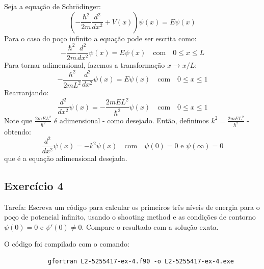 \documentclass[12pt, a4paper]{article} %
\begin{document}
        Seja a equação de Schr\"odinger:
        \begin{equation}
                \left(-\frac{\hbar^2}{2m}\frac{d^2}{dx^2} + V(x)\right)\psi(x) = E\psi(x)
        \end{equation}
        Para o caso do po\c{c}o infinito a equa\c{c}\~ao pode ser escrita como:
        \begin{equation}
                -\frac{\hbar^2}{2m}\frac{d^2}{dx^2}\psi(x) = E\psi(x) \quad \text{com} \quad 0 \leq x \leq L 
        \end{equation}
        Para tornar adimensional, fazemos a transforma\c{c}\~ao $x \longrightarrow x/L$:
        \begin{equation}
                -\frac{\hbar^2}{2mL^2}\frac{d^2}{dx^2}\psi(x) = E\psi(x) \quad \text{com} \quad 0 \leq x \leq 1
        \end{equation}
        Rearranjando:
        \begin{equation}
            \frac{d^2}{dx^2}\psi(x) = -\frac{2mEL^2}{\hbar^2}\psi(x) \quad \text{com} \quad 0 \leq x \leq 1
        \end{equation}
        Note que $\frac{2mEL^2}{\hbar^2}$ \'e adimensional - como desejado. Ent\~ao, definimos $k^2 = \frac{2mEL^2}{\hbar^2}$ - obtendo:
        \begin{equation}
            \frac{d^2}{dx^2}\psi(x) = -k^2\psi(x) \quad \text{com} \quad \psi(0) = 0 \text{ e } \psi(\infty) = 0
        \end{equation}
        que \'e a equa\c{c}\~ao adimensional desejada.


    \subsection{Exerc\'icio 4}

        Tarefa: Escreva um c\'odigo para calcular os primeiros tr\^es n\'iveis de energia para o po\c{c}o de potencial inﬁnito, usando o shooting method e as condi\c{c}\~oes de contorno $\psi(0) = 0$ e
        $\psi '(0) \neq  0$. Compare o resultado com a solu\c{c}\~ao exata.


        O c\'odigo foi compilado com o comando:
        \begin{verbatim}
            gfortran L2-5255417-ex-4.f90 -o L2-5255417-ex-4.exe
        \end{verbatim}
\end{document}
